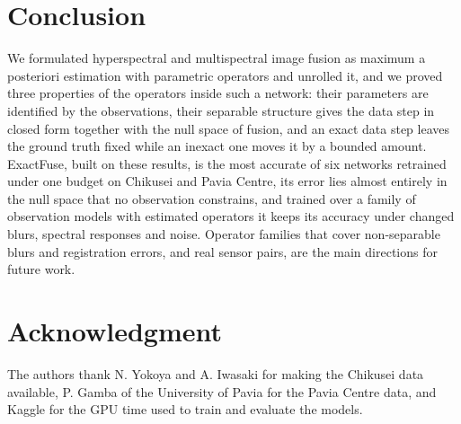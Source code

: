 \documentclass[journal]{IEEEtran}
\begin{document}
\section{Conclusion}
We formulated hyperspectral and multispectral image fusion as maximum a posteriori estimation with parametric operators and unrolled it, and we proved three properties of the operators inside such a network: their parameters are identified by the observations, their separable structure gives the data step in closed form together with the null space of fusion, and an exact data step leaves the ground truth fixed while an inexact one moves it by a bounded amount. ExactFuse, built on these results, is the most accurate of six networks retrained under one budget on Chikusei and Pavia Centre, its error lies almost entirely in the null space that no observation constrains, and trained over a family of observation models with estimated operators it keeps its accuracy under changed blurs, spectral responses and noise. Operator families that cover non-separable blurs and registration errors, and real sensor pairs, are the main directions for future work.

\section*{Acknowledgment}
The authors thank N. Yokoya and A. Iwasaki for making the Chikusei data available, P. Gamba of the University of Pavia for the Pavia Centre data, and Kaggle for the GPU time used to train and evaluate the models.



\end{document}
